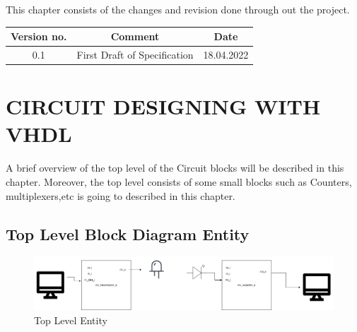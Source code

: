 \documentclass[12pt,a4paper]{article}
\begin{document}
This chapter consists of the changes and revision done through out the project. \\

\begin{center}
\begin{tabular}{ | c | c| c | } 
  \hline
  \textbf{Version no.}& \textbf{Comment} & \textbf{Date} \\ 
  \hline
  0.1 & First Draft of Specification & 18.04.2022 \\ 
  \hline
\end{tabular}
\end{center}


\newpage

\renewcommand{\baselinestretch}{1.5} %
\section{CIRCUIT DESIGNING WITH VHDL}
A brief overview of the top level of the Circuit blocks will be described in this chapter. Moreover, the top level consists of some small blocks such as Counters, multiplexers,etc is going to described in this chapter.\\


\subsection{Top Level Block Diagram Entity}

\begin{figure}[H]
\centering
\includegraphics[scale=0.25]{top.drawio.png}
\caption{Top Level Entity}
\label{Top Level Entity}
\end{figure}
\end{document}
